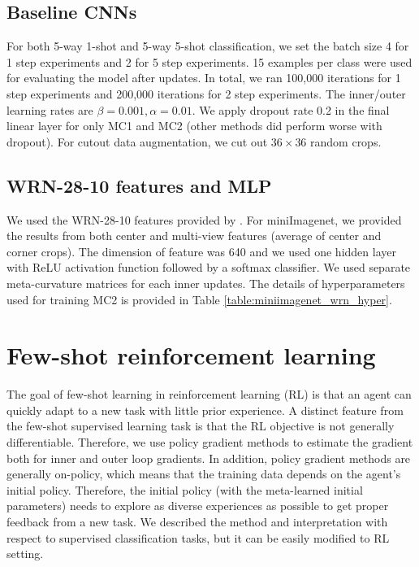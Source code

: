 \documentclass{article}
\begin{document}
\subsection{Baseline CNNs} For both 5-way 1-shot and 5-way 5-shot classification, we set the batch size 4 for 1 step experiments and 2 for 5 step experiments. 15 examples per class were used for evaluating the model after updates. In total, we ran 100,000 iterations for 1 step experiments and 200,000 iterations for 2 step experiments. The inner/outer learning rates are $\beta = 0.001, \alpha = 0.01$. We apply dropout rate 0.2 in the final linear layer for only MC1 and MC2 (other methods did perform worse with dropout). For cutout data augmentation, we cut out $36 \times 36$ random crops.

\subsection{WRN-28-10 features and MLP} We used the WRN-28-10 features provided by \cite{rusu-iclr19}. For miniImagenet, we provided the results from both center and multi-view features (average of center and corner crops). The dimension of feature was 640 and we used one hidden layer with ReLU activation function followed by a softmax classifier. We used separate meta-curvature matrices for each inner updates. The details of hyperparameters used for training MC2 is provided in Table \ref{table:miniimagenet_wrn_hyper}.

\section{Few-shot reinforcement learning}

The goal of few-shot learning in reinforcement learning (RL) is that an agent can quickly adapt to a new task with little prior experience. A distinct feature from the few-shot supervised learning task is that the RL objective is not generally differentiable. Therefore, we use policy gradient methods to estimate the gradient both for inner and outer loop gradients. In addition, policy gradient methods are generally on-policy, which means that the training data depends on the agent’s initial policy. Therefore, the initial policy (with the meta-learned initial parameters) needs to explore as diverse experiences as possible to get proper feedback from a new task. We described the method and interpretation with respect to supervised classification tasks, but it can be easily modified to RL setting. 
\end{document}
